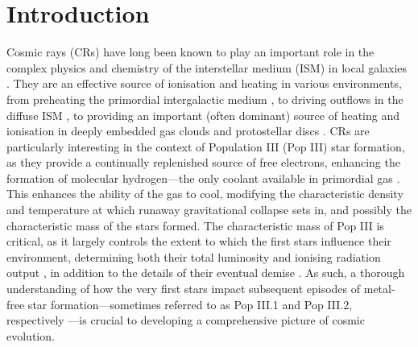 \section{Introduction}
\label{intro}

Cosmic rays (CRs) have long been known to play an important role in the complex physics and chemistry of the interstellar medium (ISM) in local galaxies \citep{GlassgoldLanger1973,GoldsmithLanger1978,CravensDalgarno1978,MannheimSchlickeiser1994,DalgarnoYanLiu1999}.  They are an effective source of ionisation and heating in various environments, from preheating the primordial intergalactic medium  \citep[IGM;][]{SazonovSunyaev2015}, to driving outflows in the diffuse ISM \citep[e.g.,][]{Ensslinetal2007,Jubelgasetal2008,SalemBryan2014,Hanaszetal2013,Boothetal2013,SalemBryanHummels2014}, to providing an important (often dominant) source of heating and ionisation in deeply embedded gas clouds and protostellar discs \citep{IndrioloFieldsMcCall2009,PadovaniGalliGlassgold2009,PadovaniHennebelleGalli2013,Padovanietal2015,GlassgoldGalliPadovani2012}. CRs are particularly interesting in the context of Population III (Pop III) star formation, as they provide a continually replenished source of free electrons, enhancing the formation of molecular hydrogen---the only coolant available in primordial gas \citep{Abeletal1997,GalliPalla1998,BrommCoppiLarson2002}.  This enhances the ability of the gas to cool, modifying the characteristic density and temperature at which runaway gravitational collapse sets in, and possibly the characteristic mass of the stars formed.   The characteristic mass of Pop III is critical, as it largely controls the extent to which the first stars influence their environment, determining both their total luminosity and ionising radiation output \citep{Schaerer2002}, in addition to the details of their eventual demise \citep{Hegeretal2003,HegerWoosley2010,MaederMeynet2012}. As such, a thorough understanding of how the very first stars impact subsequent episodes of metal-free star formation---sometimes referred to as Pop III.1 and Pop III.2, respectively \citep{McKeeTan2008}---is crucial to developing a comprehensive picture of cosmic evolution.

